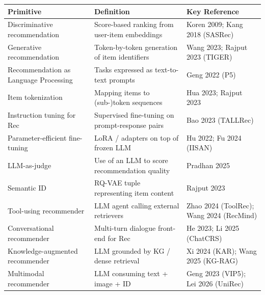 {\def\LTcaptype{none} %
\begin{longtable}[]{@{}
  >{\raggedright\arraybackslash}p{}
  >{\raggedright\arraybackslash}p{}
  >{\raggedright\arraybackslash}p{}@{}}
\toprule\noalign{}
\begin{minipage}[b]{\linewidth}\raggedright
Primitive
\end{minipage} & \begin{minipage}[b]{\linewidth}\raggedright
Definition
\end{minipage} & \begin{minipage}[b]{\linewidth}\raggedright
Key Reference
\end{minipage} \\
\midrule\noalign{}
\endhead
\bottomrule\noalign{}
\endlastfoot
Discriminative recommendation & Score-based ranking from user-item embeddings & Koren 2009; Kang 2018 (SASRec) \\
Generative recommendation & Token-by-token generation of item identifiers & Wang 2023; Rajput 2023 (TIGER) \\
Recommendation as Language Processing & Tasks expressed as text-to-text prompts & Geng 2022 (P5) \\
Item tokenization & Mapping items to (sub-)token sequences & Hua 2023; Rajput 2023 \\
Instruction tuning for Rec & Supervised fine-tuning on prompt-response pairs & Bao 2023 (TALLRec) \\
Parameter-efficient fine-tuning & LoRA / adapters on top of frozen LLM & Hu 2022; Fu 2024 (IISAN) \\
LLM-as-judge & Use of an LLM to score recommendation quality & Pradhan 2025 \\
Semantic ID & RQ-VAE tuple representing item content & Rajput 2023 \\
Tool-using recommender & LLM agent calling external retrievers & Zhao 2024 (ToolRec); Wang 2024 (RecMind) \\
Conversational recommender & Multi-turn dialogue front-end for Rec & He 2023; Li 2025 (ChatCRS) \\
Knowledge-augmented recommender & LLM grounded by KG / dense retrieval & Xi 2024 (KAR); Wang 2025 (KG-RAG) \\
Multimodal recommender & LLM consuming text + image + ID & Geng 2023 (VIP5); Lei 2026 (UniRec) \\
\end{longtable}
}

